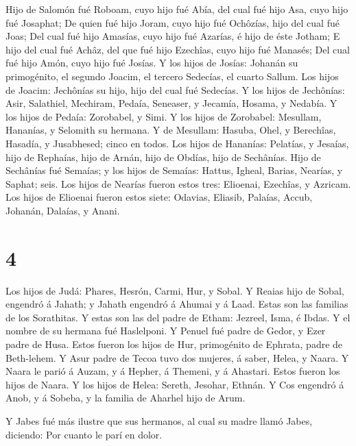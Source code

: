  Hijo de Salomón fué Roboam, cuyo hijo fué Abía, del cual
fué hijo Asa, cuyo hijo fué Josaphat;  De quien fué hijo
Joram, cuyo hijo fué Ochôzías, hijo del cual fué Joas;  Del
cual fué hijo Amasías, cuyo hijo fué Azarías, é hijo de éste Jotham;
 E hijo del cual fué Achâz, del que fué hijo Ezechîas, cuyo
hijo fué Manasés;  Del cual fué hijo Amón, cuyo hijo fué
Josías.  Y los hijos de Josías: Johanán su primogénito, el
segundo Joacim, el tercero Sedecías, el cuarto Sallum.  Los
hijos de Joacim: Jechônías su hijo, hijo del cual fué Sedecías.
 Y los hijos de Jechônías: Asir, Salathiel, 
Mechiram, Pedaía, Seneaser, y Jecamía, Hosama, y Nedabía. 
Y los hijos de Pedaía: Zorobabel, y Simi. Y los hijos de Zorobabel:
Mesullam, Hananías, y Selomith su hermana.  Y de Mesullam:
Hasuba, Ohel, y Berechîas, Hasadía, y Jusabhesed; cinco en todos.
 Los hijos de Hananías: Pelatías, y Jesaías, hijo de
Rephaías, hijo de Arnán, hijo de Obdías, hijo de Sechânías.
 Hijo de Sechânías fué Semaías; y los hijos de Semaías:
Hattus, Igheal, Barias, Nearías, y Saphat; seis.  Los hijos
de Nearías fueron estos tres: Elioenai, Ezechîas, y Azricam.
 Los hijos de Elioenai fueron estos siete: Odavias,
Eliasib, Palaías, Accub, Johanán, Dalaías, y Anani.

\hypertarget{section-3}{%
\section{4}\label{section-3}}

 Los hijos de Judá: Phares, Hesrón, Carmi, Hur, y Sobal.
 Y Reaias hijo de Sobal, engendró á Jahath; y Jahath
engendró á Ahumai y á Laad. Estas son las familias de los Sorathitas.
 Y estas son las del padre de Etham: Jezreel, Isma, é Ibdas.
Y el nombre de su hermana fué Haslelponi.  Y Penuel fué
padre de Gedor, y Ezer padre de Husa. Estos fueron los hijos de Hur,
primogénito de Ephrata, padre de Beth-lehem.  Y Asur padre
de Tecoa tuvo dos mujeres, á saber, Helea, y Naara.  Y Naara
le parió á Auzam, y á Hepher, á Themeni, y á Ahastari. Estos fueron los
hijos de Naara.  Y los hijos de Helea: Sereth, Jesohar,
Ethnán.  Y Cos engendró á Anob, y á Sobeba, y la familia de
Aharhel hijo de Arum.

 Y Jabes fué más ilustre que sus hermanos, al cual su madre
llamó Jabes, diciendo: Por cuanto le parí en dolor.

